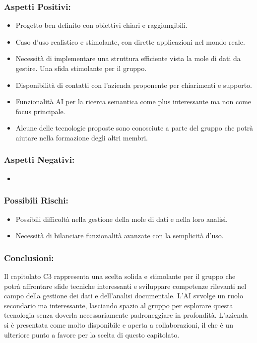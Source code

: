 \documentclass[a4paper,12pt]{article}
\begin{document}
\subsubsection*{Aspetti Positivi:}
\begin{itemize}
    \item Progetto ben definito con obiettivi chiari e raggiungibili.
    \item Caso d'uso realistico e stimolante, con dirette applicazioni nel mondo reale.
    \item Necessità di implementare una struttura efficiente vista la mole di dati da gestire. Una sfida stimolante per il gruppo.
    \item Disponibilità di contatti con l'azienda proponente per chiarimenti e supporto.
    \item Funzionalità AI per la ricerca semantica come plus interessante ma non come focus principale.
    \item Alcune delle tecnologie proposte sono conosciute a parte del gruppo che potrà aiutare nella formazione degli altri membri.
\end{itemize}

\subsubsection*{Aspetti Negativi:}
\begin{itemize}
    \item 
\end{itemize}

\subsubsection*{Possibili Rischi:}
\begin{itemize}
    \item Possibili difficoltà nella gestione della mole di dati e nella loro analisi.
    \item Necessità di bilanciare funzionalità avanzate con la semplicità d'uso.
\end{itemize}

\subsubsection*{Conclusioni:}
Il capitolato C3 rappresenta una scelta solida e stimolante per il gruppo che potrà affrontare sfide tecniche interessanti e sviluppare competenze rilevanti nel campo della gestione dei dati e dell'analisi documentale. 
L'AI svvolge un ruolo secondario ma interessante, lasciando spazio al gruppo per esplorare questa tecnologia senza doverla necessariamente padroneggiare in profondità.
L'azienda si è presentata come molto disponibile e aperta a collaborazioni, il che è un ulteriore punto a favore per la scelta di questo capitolato. 
\end{document}
